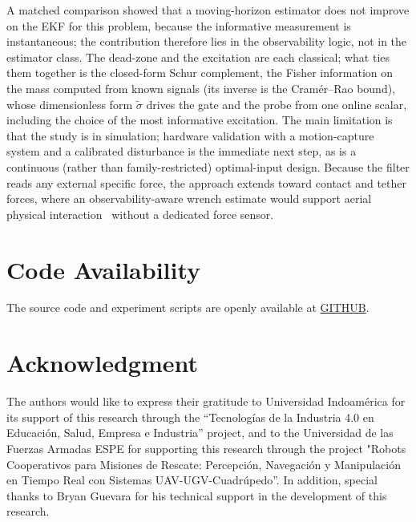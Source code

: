 \documentclass{ieeeaccess}
\begin{document}
A matched comparison showed that a moving-horizon estimator does not improve on
the EKF for this problem, because the informative measurement is instantaneous;
the contribution therefore lies in the observability logic, not in the estimator
class. The dead-zone and the excitation are each classical; what ties them together
is the closed-form Schur complement, the Fisher information on the mass computed from
known signals (its inverse is the Cram\'er--Rao bound), whose dimensionless form
$\tilde\sigma$ drives the gate and the probe from one online scalar, including the
choice of the most informative excitation. The main
limitation is that the study is in simulation; hardware validation with a
motion-capture system and a calibrated disturbance is the immediate next step, as
is a continuous (rather than family-restricted) optimal-input design.
Because the filter reads any external specific force, the approach extends toward
contact and tether forces, where an observability-aware wrench estimate would
support aerial physical interaction~\cite{ollero2022past,augugliaro2013admittance} without a dedicated force sensor.

\section*{Code Availability}
The source code and experiment scripts are openly available at \href{https://github.com/bryansgue/observability-aware}{GITHUB}.

\section*{Acknowledgment}
The authors would like to express their gratitude to Universidad Indoamérica for its support of this research through the “Tecnologías de la Industria 4.0 en Educación, Salud, Empresa e Industria” project, and to the Universidad de las Fuerzas Armadas ESPE for supporting this research through the project "Robots Cooperativos para Misiones de Rescate: Percepción, Navegación y Manipulación en Tiempo Real con Sistemas UAV-UGV-Cuadrúpedo”. In addition, special thanks to Bryan Guevara for his technical support in the development of this research.




\end{document}
